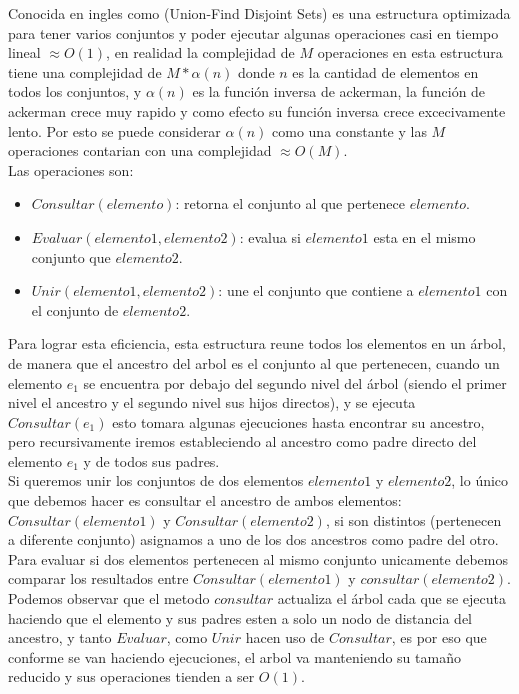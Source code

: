 Conocida en ingles como (Union-Find Disjoint Sets) es una estructura optimizada para tener varios conjuntos y poder 	ejecutar algunas operaciones casi en tiempo lineal $\approx O(1)$, en realidad la complejidad de $M$ operaciones en esta estructura tiene una complejidad de $M*\alpha(n)$ donde $n$ es la cantidad de elementos en todos los conjuntos, y $\alpha(n)$ es la función inversa de ackerman, la función de ackerman crece muy rapido y como efecto su función inversa crece excecivamente lento. Por esto se puede considerar $\alpha(n)$ como una constante y las $M$ operaciones contarian con una complejidad $\approx O(M)$.
\\Las operaciones son:
\\\begin{itemize}
\item $Consultar(elemento)$: retorna el conjunto al que pertenece $elemento$.
\item $Evaluar(elemento1,elemento2)$: evalua si $elemento1$ esta en el mismo conjunto que $elemento2$.
\item $Unir(elemento1,elemento2)$: une el conjunto que contiene a $elemento1$ con el conjunto de $elemento2$.
\end{itemize}
Para lograr esta eficiencia, esta estructura reune todos los elementos en un árbol, de manera que el ancestro del arbol es el conjunto al que pertenecen, cuando un elemento $e_1$ se encuentra por debajo del segundo nivel del árbol (siendo el primer nivel el ancestro y el segundo nivel sus hijos directos), y se ejecuta $Consultar(e_1)$ esto tomara algunas ejecuciones hasta encontrar su ancestro, pero recursivamente iremos estableciendo al ancestro como padre directo del elemento $e_1$ y de todos sus padres.
\\
Si queremos unir los conjuntos de dos elementos $elemento1$ y $elemento2$, lo único que debemos hacer es consultar el ancestro de ambos elementos: $Consultar(elemento1)$ y $Consultar(elemento2)$, si son distintos (pertenecen a diferente conjunto) asignamos a uno de los dos ancestros como padre del otro.
\\
Para evaluar si dos elementos pertenecen al mismo conjunto unicamente debemos comparar los resultados entre $Consultar(elemento1)$ y $consultar(elemento2)$.
\\Podemos observar que el metodo $consultar$ actualiza el árbol cada que se ejecuta haciendo que el elemento y sus padres esten a solo un nodo de distancia del ancestro, y tanto $Evaluar$, como $Unir$ hacen uso de $Consultar$, es por eso que conforme se van haciendo ejecuciones, el arbol va manteniendo su tamaño reducido y sus operaciones tienden a ser $O(1)$.
